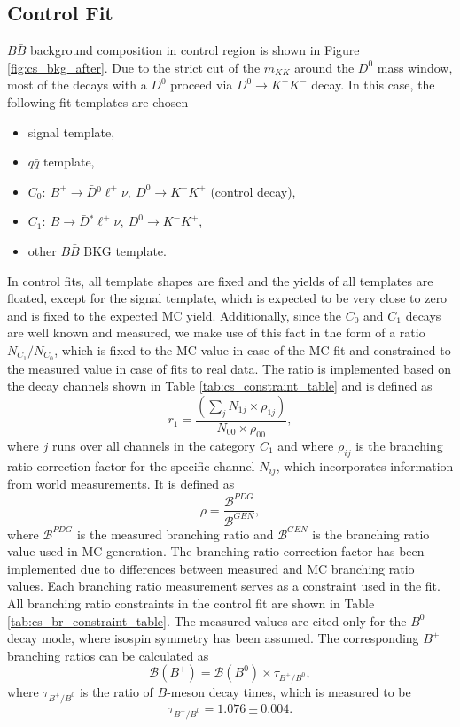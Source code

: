 \subsection{Control Fit}\label{sec:control-fit}
$B \bar B$ background composition in control region is shown in Figure \ref{fig:cs_bkg_after}. Due to the strict cut of the $m_{KK}$ around the $D^0$ mass window, most of the decays with a $D^0$ proceed via $D^0 \to K^+K^-$ decay. In this case, the following fit templates are chosen
\begin{itemize}
	\item signal template,
	\item $q \bar q$ template,
	\item $C_0:~B^+ \to \bar{D} {}^0 \ell^+ \nu,~D^0 \to K^-K^+$ (control decay),
	\item $C_1:~B \to \bar{D} {}^* \ell^+ \nu,~D^0 \to K^-K^+$,
	\item other $B \bar B$ BKG template.
\end{itemize}
In control fits, all template shapes are fixed and the yields of all templates are floated, except for the signal template, which is expected to be very close to zero and is fixed to the expected MC yield. Additionally, since the $C_0$ and $C_1$ decays are well known and measured, we make use of this fact in the form of a ratio $N_{C_1}/N_{C_0}$, which is fixed to the MC value in case of the MC fit and constrained to the measured value in case of fits to real data. The ratio is implemented based on the decay channels shown in Table \ref{tab:cs_constraint_table} and is defined as
\begin{equation}
r_1 = \frac{\left(\sum_j N_{1j}\times \rho_{1j} \right)}{N_{00} \times \rho_{00}},
\label{eq:cs_fix}
\end{equation}
where $j$ runs over all channels in the category $C_1$ and where $\rho_{ij}$ is the branching ratio correction factor for the specific channel $N_{ij}$, which incorporates information from world measurements. It is defined as 
\begin{equation}
\rho = \frac{\mathcal{B}^{PDG}}{\mathcal{B}^{GEN}},
\label{eq:br_fix}
\end{equation}
where $\mathcal{B}^{PDG}$ is the measured branching ratio and $\mathcal{B}^{GEN}$ is the branching ratio value used in MC generation. The branching ratio correction factor has been implemented due to differences between measured and MC branching ratio values. Each branching ratio measurement serves as a constraint used in the fit. All branching ratio constraints in the control fit are shown in Table \ref{tab:cs_br_constraint_table}. The measured values are cited only for the $B^0$ decay mode, where isospin symmetry has been assumed. The corresponding $B^+$ branching ratios can be calculated as
\begin{equation}
\mathcal{B}(B^+) = \mathcal{B}(B^0) \times \tau_{B^+/B^0},
\end{equation}
where $\tau_{B^+/B^0}$ is the ratio of $B$-meson decay times, which is measured to be \cite{Amhis:2016xyh}
\begin{equation}
\tau_{B^+/B^0} = 1.076 \pm 0.004.
\end{equation}

